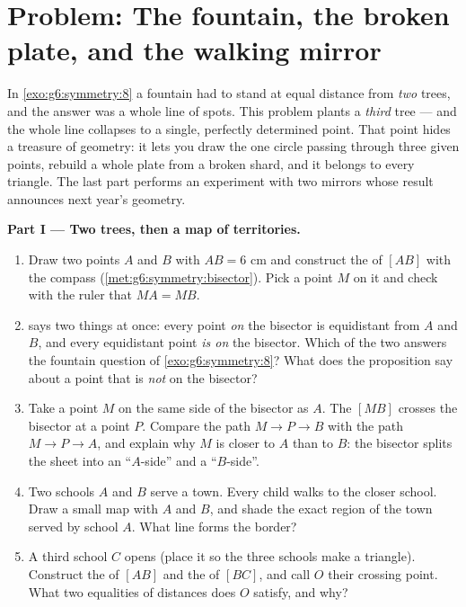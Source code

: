 \section{Problem: The fountain, the broken plate, and the walking
mirror}

\begin{problem}
\label{pb:g6:symmetry:1}
In \cref{exo:g6:symmetry:8} a fountain had to stand at equal
distance from \emph{two} trees, and the answer was a whole line of
spots. This problem plants a \emph{third} tree --- and the whole
line collapses to a single, perfectly determined point. That
point hides a treasure of geometry: it lets you draw the one
circle passing through three given points, rebuild a whole plate
from a broken shard, and it belongs to every triangle. The last
part performs an experiment with two mirrors whose result
announces next year's geometry.

\medskip
\noindent\textbf{Part I --- Two trees, then a map of
territories.}
\begin{enumerate}
  \item Draw two points $A$ and $B$ with $AB = 6$ cm and
        construct the  of $[AB]$ with the
        compass (\cref{met:g6:symmetry:bisector}). Pick a point
        $M$ on it and check with the ruler that $MA = MB$.
  \item {} says two things at
        once: every point \emph{on} the bisector is equidistant
        from $A$ and $B$, and every equidistant point \emph{is
        on} the bisector. Which of the two answers the fountain
        question of \cref{exo:g6:symmetry:8}? What does the
        proposition say about a point that is \emph{not} on the
        bisector?
  \item Take a point $M$ on the same side of the bisector as
        $A$. The  $[MB]$ crosses the bisector at a point
        $P$. Compare the path $M \to P \to B$ with the path
        $M \to P \to A$, and explain why $M$ is closer to $A$
        than to $B$: the bisector splits the sheet into an
        ``$A$-side'' and a ``$B$-side''.
  \item Two schools $A$ and $B$ serve a town. Every child walks
        to the closer school. Draw a small map with $A$ and $B$,
        and shade the exact region of the town served by school
        $A$. What line forms the border?
  \item A third school $C$ opens (place it so the three schools
        make a triangle). Construct the 
        of $[AB]$ and the  of $[BC]$, and
        call $O$ their crossing point. What two equalities of
        distances does $O$ satisfy, and why?
\end{enumerate}


\end{problem}
